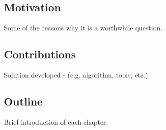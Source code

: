 \subsection{Motivation}
Some of the reasons why it is a worthwhile question.


\subsection{Contributions}
Solution developed - (e.g. algorithm, tools, etc.)


\subsection{Outline}




Brief introduction of each chapter %


